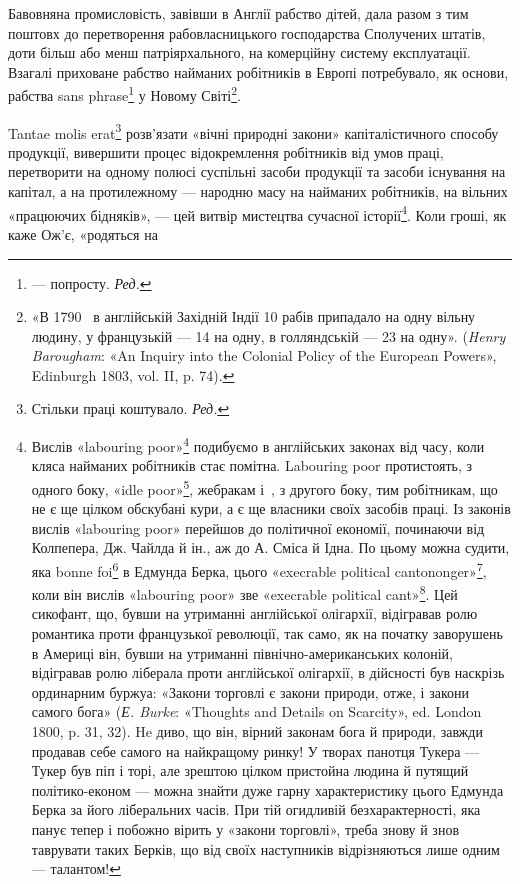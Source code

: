 Бавовняна промисловість, завівши в Англії рабство дітей,
дала разом з тим поштовх до перетворення рабовласницького
господарства Сполучених штатів, доти більш або менш патріярхального,
на комерційну систему експлуатації. Взагалі приховане
рабство найманих робітників в Европі потребувало, як основи,
рабства sans phrase\footnote*{
— попросту. \emph{Ред.}
} у Новому Світі\footnote{
«В 1790~ в англійській Західній Індії 10 рабів припадало на
одну вільну людину, у французькій — 14 на одну, в голляндській — 23
на одну». (\emph{Henry Barougham}: «An Inquiry into the Colonial Policy of
the European Powers», Edinburgh 1803, vol. II, p. 74).
}.

Tantae molis erat\footnote*{
Стільки праці коштувало. \emph{Ред.}
} розв’язати «вічні природні закони»
капіталістичного способу продукції, вивершити процес відокремлення
робітників від умов праці, перетворити на одному
полюсі суспільні засоби продукції та засоби існування на капітал,
а на протилежному — народню масу на найманих робітників,
на вільних «працюючих бідняків», — цей витвір мистецтва
сучасної історії\footnote{
Вислів «labouring poor»\footnote*{
— працюючі бідняки. \emph{Ред.}
} подибуємо в англійських законах від
часу, коли кляса найманих робітників стає помітна. Labouring poor протистоять,
з одного боку, «idle poor»\footnote*{
— біднякам-неробам. \emph{Ред.}
}, жебракам і~, з другого боку,
тим робітникам, що не є ще цілком обскубані кури, а є ще власники
своїх засобів праці. Із законів вислів «labouring poor» перейшов
до політичної економії, починаючи від Колпепера, Дж. Чайлда й ін.,
аж до А. Сміса й Ідна. По цьому можна судити, яка bonne foi\footnote*{
— сумлінність. \emph{Ред.}
} в Едмунда
Берка, цього «execrable political cantononger»\footnote*{
— огидливого політичного крамаря. \emph{Ред.}
}, коли він вислів
«labouring poor» зве «execrable political cant»\footnote*{
— огидливим політичним перекрученням. \emph{Ред.}
}. Цей сикофант, що,
бувши на утриманні англійської олігархії, відігравав ролю романтика проти
французької революції, так само, як на початку заворушень в Америці
він, бувши на утриманні північно-американських колоній, відігравав
ролю ліберала проти англійської олігархії, в дійсності був наскрізь ординарним
буржуа: «Закони торговлі є закони природи, отже, і закони самого
бога» (\emph{Е. Burke}: «Thoughts and Details on Scarcity», ed. London
1800, p. 31, 32). He диво, що він, вірний законам бога й природи, завжди
продавав себе самого на найкращому ринку! У творах панотця Тукера —
Тукер був піп і торі, але зрештою цілком пристойна людина й путящий
політико-економ — можна знайти дуже гарну характеристику цього
Едмунда Берка за його ліберальних часів. При тій огидливій безхарактерності,
яка панує тепер і побожно вірить у «закони торговлі», треба
знову й знов таврувати таких Берків, що від своїх наступників відрізняються
лише одним — талантом!
}. Коли гроші, як каже Ож’є, «родяться на
